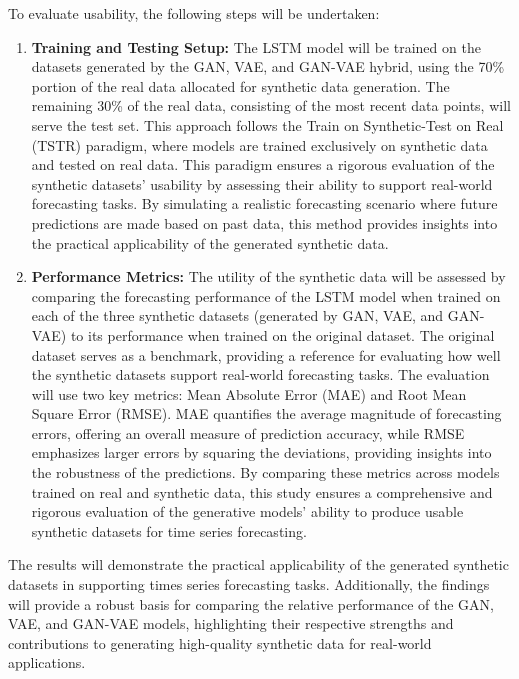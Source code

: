 \documentclass{article}
\begin{document}
To evaluate usability, the following steps will be undertaken:
\begin{enumerate}
    \item \textbf{Training and Testing Setup:} The LSTM model will be trained on the datasets generated by the GAN, VAE, and GAN-VAE hybrid, using the 70\% portion of the real data allocated for synthetic data generation. The remaining 30\% of the real data, consisting of the most recent data points, will serve the test set. This approach follows the Train on Synthetic-Test on Real (TSTR) paradigm, where models are trained exclusively on synthetic data and tested on real data. This paradigm ensures a rigorous evaluation of the synthetic datasets' usability by assessing their ability to support real-world forecasting tasks. By simulating a realistic forecasting scenario where future predictions are made based on past data, this method provides insights into the practical applicability of the generated synthetic data.

    \item \textbf{Performance Metrics:} The utility of the synthetic data will be assessed by comparing the forecasting performance of the LSTM model when trained on each of the three synthetic datasets (generated by GAN, VAE, and GAN-VAE) to its performance when trained on the original dataset. The original dataset serves as a benchmark, providing a reference for evaluating how well the synthetic datasets support real-world forecasting tasks. The evaluation will use two key metrics: Mean Absolute Error (MAE) and Root Mean Square Error (RMSE). MAE quantifies the average magnitude of forecasting errors, offering an overall measure of prediction accuracy, while RMSE emphasizes larger errors by squaring the deviations, providing insights into the robustness of the predictions. By comparing these metrics across models trained on real and synthetic data, this study ensures a comprehensive and rigorous evaluation of the generative models' ability to produce usable synthetic datasets for time series forecasting.
\end{enumerate}

The results will demonstrate the practical applicability of the generated synthetic datasets in supporting times series forecasting tasks. Additionally, the findings will provide a robust basis for comparing the relative performance of the GAN, VAE, and GAN-VAE models, highlighting their respective strengths and contributions to generating high-quality synthetic data for real-world applications. 
\end{document}
